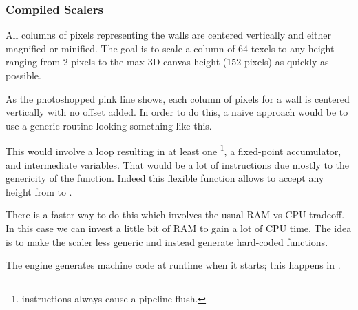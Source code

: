 \subsubsection{Compiled Scalers}
All columns of pixels representing the walls are centered vertically and either magnified or minified. The goal is to scale a column of 64 texels to any height ranging from 2 pixels to the max 3D canvas height (152 pixels) as quickly as possible.\\
\par
 \begin{figure}[H]
\centering
 \end{figure}
\par
As the photoshopped pink line shows, each column of pixels for a wall is centered vertically with no offset added. In order to do this, a naive approach would be to use a generic routine looking something like this.\\


\par
\begin{minipage}{\textwidth}

\end{minipage}

\par
This would involve a loop resulting in at least one \footnote{ instructions always cause a pipeline flush.}, a fixed-point accumulator, and intermediate variables. That would be a lot of instructions due mostly to the genericity of the function. Indeed this flexible function allows  to accept any height from  to .\\
\par
 There is a faster way to do this which involves the usual RAM vs CPU tradeoff. In this case we can invest a little bit of RAM to gain a lot of CPU time. The idea is to make the scaler less generic and instead generate hard-coded functions.\\
 \par 

\par
\begin{minipage}{\textwidth}

\end{minipage}

 The engine generates machine code at runtime when it starts; this happens in .\\
 
